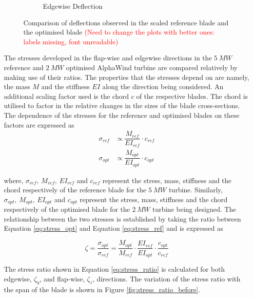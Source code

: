\begin{figure}[H]
\begin{subfigure}{0.60\textwidth}
\caption{Edgewise Deflection}
\label{fig:deflection_flap_compare}
\end{subfigure}
\caption{Comparison of deflections observed in the scaled reference blade and the optimised blade \textcolor{red}{(Need to change the plots with better ones: labels missing, font unreadable)} }
\label{fig:deflection_compare}
\end{figure}

The stresses developed in the flap-wise and edgewise directions in the $5\ MW$ reference and $2\ MW$ optimised AlphaWind turbine are compared relatively by making use of their ratios. The properties that the stresses depend on are namely, the mass $M$ and the stiffness $EI$ along the direction being considered. An additional scaling factor used is the chord $c$ of the respective blades. The chord is utilised to factor in the relative changes in the sizes of the blade cross-sections. The dependence of the stresses for the reference and optimised blades on these factors are expressed as
\begin{align}
    \sigma_{ref} &\propto \dfrac{M_{ref}}{EI_{ref}}\cdot c_{ref} \label{eq:stress_ref} \\
    \sigma_{opt} &\propto \dfrac{M_{opt}}{EI_{opt}}\cdot c_{opt} \label{eq:stress_opt}
\end{align}

where, $\sigma_{ref},\ M_{ref},\ EI_{ref}$ and $c_{ref}$ represent the stress, mass, stiffness and the chord respectively of the reference blade for the  $5\ MW$ turbine. Similarly, $\sigma_{opt},\ M_{opt},\ EI_{opt}$ and $c_{opt}$ represent the stress, mass, stiffness and the chord respectively of the optimised blade for the  $2\ MW$ turbine being designed. The relationship between the two stresses is established by taking the ratio between Equation \ref{eq:stress_opt} and Equation \ref{eq:stress_ref} and is expressed as

\begin{equation}
     \zeta = \dfrac{\sigma_{opt}}{\sigma_{ref}} = \dfrac{M_{opt}}{M_{ref}}\cdot\dfrac{EI_{ref}}{EI_{opt}}\cdot \dfrac{c_{opt}}{c_{ref}}
\label{eq:stress_ratio}
\end{equation}

The stress ratio shown in Equation \ref{eq:stress_ratio} is calculated for both edgewise, $\zeta_y$, and flap-wise, $\zeta_z$, directions. The variation of the stress ratio with the span of the blade is shown in Figure \ref{fig:stress_ratio_before}.

